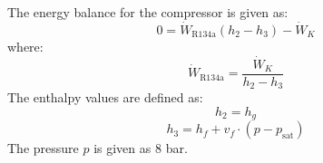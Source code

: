 The energy balance for the compressor is given as:  
\[
0 = \dot{W}_{\text{R134a}} (h_2 - h_3) - \dot{W}_K
\]  
where:  
\[
\dot{W}_{\text{R134a}} = \frac{\dot{W}_K}{h_2 - h_3}
\]  
The enthalpy values are defined as:  
\[
h_2 = h_g
\]  
\[
h_3 = h_f + v_f \cdot (p - p_{\text{sat}})
\]  
The pressure \(p\) is given as 8 bar.